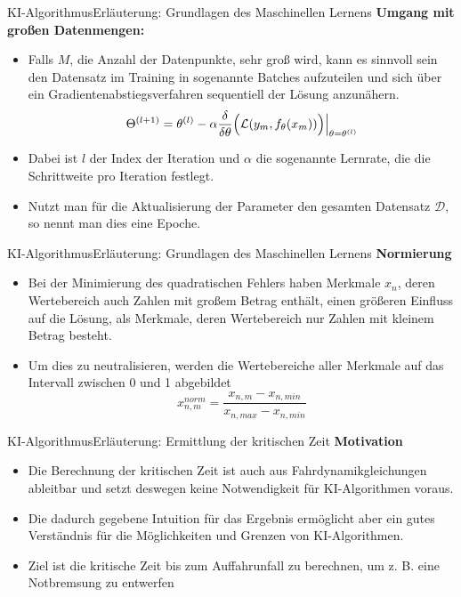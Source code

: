 \documentclass[169, handout	]{THIbeamer} %
\begin{document}
	\begin{frame}{KI-Algorithmus}{Erläuterung: Grundlagen des Maschinellen Lernens}
		\textbf{Umgang mit großen Datenmengen:}
		\begin{itemize}
			\item Falls $M$, die Anzahl der Datenpunkte, sehr groß wird, kann es sinnvoll sein den Datensatz im Training in sogenannte Batches aufzuteilen und sich über ein Gradientenabstiegsverfahren sequentiell der Lösung anzunähern.
			\begin{equation}
				\Theta ^{(l+1)} = \theta ^{(l)} - \alpha \frac{\delta}{\delta \theta} \Bigl(\mathcal{L} (y_m, f_{\theta} (x_m))\Bigr) \Big| _{\theta = \theta^{(l)}}
			\end{equation}
			\item[] Dabei ist $l$ der Index der Iteration und $\alpha$ die sogenannte Lernrate, die die Schrittweite pro Iteration festlegt.
			\item Nutzt man für die Aktualisierung der Parameter den gesamten Datensatz $\mathcal{D}$, so nennt man dies eine Epoche.
		\end{itemize}
	\end{frame}
	\begin{frame}{KI-Algorithmus}{Erläuterung: Grundlagen des Maschinellen Lernens}
		\textbf{Normierung}
		\begin{itemize}
			\item Bei der Minimierung des quadratischen Fehlers haben Merkmale $x_n$, deren Wertebereich auch Zahlen mit großem Betrag enthält, einen größeren Einfluss auf die Lösung, als Merkmale, deren Wertebereich nur Zahlen mit kleinem Betrag besteht.
			\item Um dies zu neutralisieren, werden die Wertebereiche aller Merkmale auf das Intervall zwischen 0 und 1 abgebildet
			\begin{equation}
				x_{n,m}^{norm} = \frac{x_{n,m} - x_{n,min}}{x_{n,max} - x_{n,min}}
			\end{equation}
		\end{itemize}
	\end{frame}
	\begin{frame}{KI-Algorithmus}{Erläuterung: Ermittlung der kritischen Zeit}
		\textbf{Motivation}
		\begin{itemize}
			\item Die Berechnung der kritischen Zeit ist auch aus Fahrdynamikgleichungen ableitbar und setzt deswegen keine Notwendigkeit für KI-Algorithmen voraus.
			\item Die dadurch gegebene Intuition für das Ergebnis ermöglicht aber ein gutes Verständnis für die Möglichkeiten und Grenzen von KI-Algorithmen.
			\item Ziel ist die kritische Zeit bis zum Auffahrunfall zu berechnen, um z. B. eine Notbremsung zu entwerfen
		\end{itemize}
	\end{frame}
\end{document}
